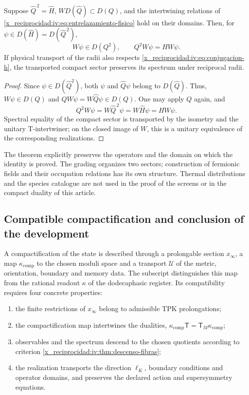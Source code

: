 \begin{theorem}
\label{x_reciprocidad:iv:thm:supercarga-transporte}
Suppose \(\widehat Q^{\,2}=\widehat H\),
\(W D(\widehat Q)\subset D(Q)\), and the
intertwining relations of \eqref{x_reciprocidad:iv:eq:entrelazamiento-fisico}
hold on their domains. Then, for
\(\psi\in D(\widehat H)=D(\widehat Q^{\,2})\),
\[
 W\psi\in D(Q^2),\qquad Q^2W\psi=HW\psi.
\]
If physical transport of the radii also respects
\eqref{x_reciprocidad:iv:eq:conjugacion-h}, the transported compact
sector preserves its spectrum under reciprocal radii.
\end{theorem}
\begin{proof}
Since \(\psi\in D(\widehat Q^2)\), both
\(\psi\) and \(\widehat Q\psi\) belong
to \(D(\widehat Q)\). Thus, \(W\psi\in D(Q)\)
and \(QW\psi=W\widehat Q\psi\in D(Q)\). One may
apply \(Q\) again, and
\[
 Q^2W\psi=W\widehat Q^{\,2}\psi
          =W\widehat H\psi=HW\psi.
\]
Spectral equality of the compact sector is transported
by the isometry and the unitary T-intertwiner;
on the closed image of \(W\), this is a
unitary equivalence of the corresponding realizations.
\end{proof}

The theorem explicitly preserves the operators and the
domain on which the identity is proved. The
grading organizes two sectors; construction of
fermionic fields and their occupation relations has
its own structure. Thermal distributions and the
species catalogue are not used in the proof
of the screens or in the compact duality of this
article.

\subsection{Compatible compactification and conclusion of the development}

A compactification of the state is described through
a prolongable section \(x_\infty\), a map
\(\kappa_{\mathrm{comp}}\) to the chosen moduli
space and a transport \(\mathcal U\) of the
metric, orientation, boundary and memory data. The
subscript distinguishes this map from the rational readout
\(\kappa\) of the dodecaphasic register. Its compatibility
requires four concrete properties:
\begin{enumerate}
\item the finite restrictions of \(x_\infty\)
      belong to admissible TPK prolongations;
\item the compactification map intertwines the dualities,
      \(\kappa_{\mathrm{comp}}\mathsf T
        =\mathsf T_M\kappa_{\mathrm{comp}}\);
\item observables and the spectrum descend to the
      chosen quotients according to criterion
      \ref{x_reciprocidad:iv:thm:descenso-fibras};
\item the realization transports the direction
      \(\ell_K\), boundary conditions and operator
      domains, and preserves the declared action
      and supersymmetry equations.
\end{enumerate}

